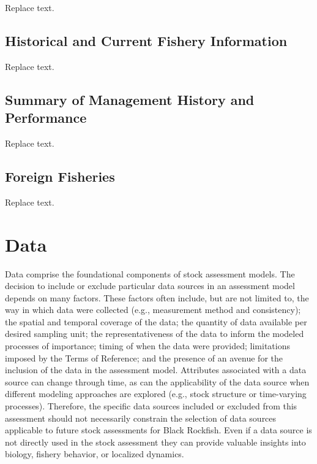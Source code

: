 \documentclass[11pt,
  english,
  letterpaper,
]{article}
\begin{document}
Replace text.

\hypertarget{historical-and-current-fishery-information}{%
\subsection{Historical and Current Fishery Information}\label{historical-and-current-fishery-information}}

Replace text.

\hypertarget{summary-of-management-history-and-performance}{%
\subsection{Summary of Management History and Performance}\label{summary-of-management-history-and-performance}}

Replace text.

\hypertarget{foreign-fisheries}{%
\subsection{Foreign Fisheries}\label{foreign-fisheries}}

Replace text.

\hypertarget{data}{%
\section{Data}\label{data}}

Data comprise the foundational components of stock assessment models. The decision to include or exclude particular data sources in an assessment model depends on many factors. These factors often include, but are not limited to, the way in which data were collected (e.g., measurement method and consistency); the spatial and temporal coverage of the data; the quantity of data available per desired sampling unit; the representativeness of the data to inform the modeled processes of importance; timing of when the data were provided; limitations imposed by the Terms of Reference; and the presence of an avenue for the inclusion of the data in the assessment model. Attributes associated with a data source can change through time, as can the applicability of the data source when different modeling approaches are explored (e.g., stock structure or time-varying processes). Therefore, the specific data sources included or excluded from this assessment should not necessarily constrain the selection of data sources applicable to future stock assessments for Black Rockfish. Even if a data source is not directly used in the stock assessment they can provide valuable insights into biology, fishery behavior, or localized dynamics.
\end{document}
